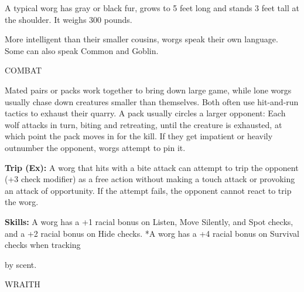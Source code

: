 \documentclass{article}
\begin{document}
A typical worg has gray or black fur, grows to 5 feet long and stands 3 feet tall 
at the shoulder. It weighs 300 pounds.

More intelligent than their smaller cousins, worgs speak their own language. Some 
can also speak Common and Goblin.

COMBAT

Mated pairs or packs work together to bring down large game, while lone worgs usually 
chase down creatures smaller than themselves. Both often use hit-and-run tactics 
to exhaust their quarry. A pack usually circles a larger opponent: Each wolf attacks 
in turn, biting and retreating, until the creature is exhausted, at which point 
the pack moves in for the kill. If they get impatient or heavily outnumber the 
opponent, worgs attempt to pin it.

\textbf{Trip (Ex):} A worg that hits with a bite attack can attempt to trip the 
opponent (+3 check modifier) as a free action without making a touch attack or 
provoking an attack of opportunity. If the attempt fails, the opponent cannot react 
to trip the worg.

\textbf{Skills: }A worg has a +1 racial bonus on Listen, Move Silently, and Spot 
checks, and a +2 racial bonus on Hide checks. *A worg has a +4 racial bonus on 
Survival checks when tracking

by scent.

\vspace{12pt}
{\LARGE{}WRAITH}
\end{document}
